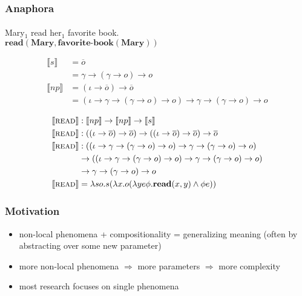 \documentclass{beamer}
\newcommand{\sem}[1]{\llbracket #1 \rrbracket}
\newcommand{\semdom}[1]{\textbf{#1}}
\begin{document}
\begin{frame}
  \frametitle{Anaphora}
  \framesubtitle{\textcite{de2006towards}}

  \label{ex:anaphora} Mary$_1$ read her$_1$ favorite book. \\
  $\semdom{read}(\semdom{Mary}, \semdom{favorite-book}(\semdom{Mary}))$

  \vspace{-2mm}

  \begin{align*}
  \sem{s}  &= \overline{o} \\
           &= \gamma \to (\gamma \to o) \to o \\
  \sem{np} &= (\iota \to \overline{o}) \to \overline{o} \\
           &= (\iota \to \gamma \to (\gamma \to o) \to o) \to \gamma \to (\gamma \to o) \to o
  \end{align*}

  \vspace{-3mm}

  \begin{align*}
  \sem{\textsc{read}} & : \sem{np} \to \sem{np} \to \sem{s} \\
  \sem{\textsc{read}} & : ((\iota \to \overline{o}) \to \overline{o}) \to
                          ((\iota \to \overline{o}) \to \overline{o}) \to
                          \overline{o} \\
  \sem{\textsc{read}} & : ((\iota \to \gamma \to (\gamma \to o) \to o)
                           \to \gamma \to (\gamma \to o) \to o) \\ & \to
                          ((\iota \to \gamma \to (\gamma \to o) \to o)
                           \to \gamma \to (\gamma \to o) \to o) \\ & \to
                           \gamma \to (\gamma \to o) \to o \\
  \sem{\textsc{read}} & = \lambda s o. s (\lambda x. o (\lambda y e
  \phi. \textbf{read}(x, y) \land \phi e))
  \end{align*}

\end{frame}




\begin{frame} \frametitle{Motivation}

  \vfill
\begin{itemize}
\item non-local phenomena + compositionality = generalizing meaning (often by
  abstracting over some new parameter)
  \vfill
\item more non-local phenomena $\Rightarrow$ more parameters $\Rightarrow$
  more complexity
  \vfill
\item most research focuses on single phenomena
\end{itemize}
  \vfill

\end{frame}
 
\end{document}
